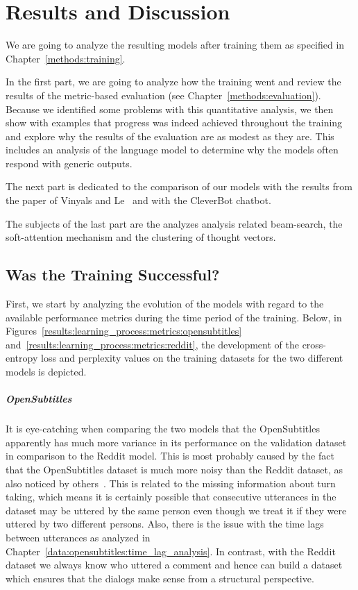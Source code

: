 \chapter{Results and Discussion}
\label{Results_and_Discussion}
We are going to analyze the resulting models after training them as specified in Chapter~\ref{methods:training}.

In the first part, we are going to analyze how the training went and review the results of the metric-based evaluation (see Chapter~\ref{methods:evaluation}). Because we identified some problems with this quantitative analysis, we then show with examples that progress was indeed achieved throughout the training and explore why the results of the evaluation are as modest as they are. This includes an analysis of the language model to determine why the models often respond with generic outputs.

The next part is dedicated to the comparison of our models with the results from the paper of Vinyals and Le~\cite{Vinyals:2015} and with the CleverBot chatbot.

The subjects of the last part are the analyzes analysis related beam-search, the soft-attention mechanism and the clustering of thought vectors.

\section{Was the Training Successful?}
First, we start by analyzing the evolution of the models with regard to the available performance metrics during the time period of the training. Below, in Figures~\ref{results:learning_process:metrics:opensubtitles} and~\ref{results:learning_process:metrics:reddit}, the development of the cross-entropy loss and perplexity values on the training datasets for the two different models is depicted.

\paragraph{OpenSubtitles} It is eye-catching when comparing the two models that the OpenSubtitles apparently has much more variance in its performance on the validation dataset in comparison to the Reddit model. This is most probably caused by the fact that the OpenSubtitles dataset is much more noisy than the Reddit dataset, as also noticed by others~\cite{Vinyals:2015}. This is related to the missing information about turn taking, which means it is certainly possible that consecutive utterances in the dataset may be uttered by the same person even though we treat it if they were uttered by two different persons. Also, there is the issue with the time lags between utterances as analyzed in Chapter~\ref{data:opensubtitles:time_lag_analysis}. In contrast, with the Reddit dataset we always know who uttered a comment and hence can build a dataset which ensures that the dialogs make sense from a structural perspective.

